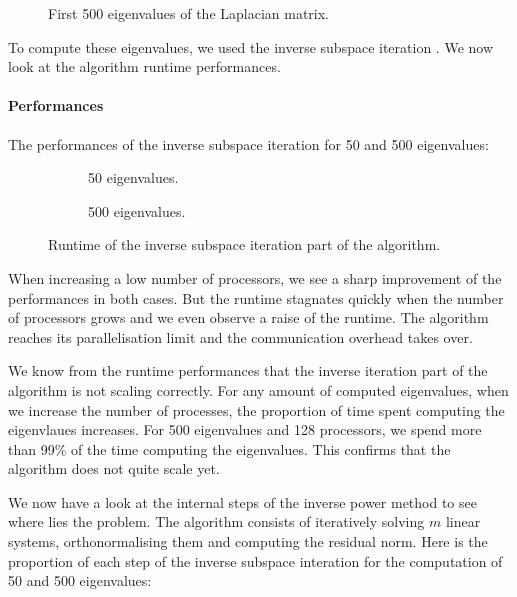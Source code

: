 \begin{figure}[H]
  \centering
  
  \caption{First 500 eigenvalues of the Laplacian matrix.}
\end{figure}

To compute these eigenvalues, we used the inverse subspace iteration \cite{el_khoury_acceleration_2014}.
We now look at the algorithm runtime performances.

\paragraph{Performances}
The performances of the inverse subspace iteration for 50 and 500 eigenvalues:

\begin{figure}[H]
  \centering
  \begin{subfigure}[b]{0.5\textwidth}
   
   \caption{50 eigenvalues.}
  \end{subfigure}
  \begin{subfigure}[b]{0.45\textwidth}
   
   \caption{500 eigenvalues.}
  \end{subfigure}
  \caption{Runtime of the inverse subspace iteration part of the algorithm.}
\end{figure}

When increasing a low number of processors, we see a sharp improvement of the performances in both cases.
But the runtime stagnates quickly when the number of processors grows and we even observe a raise of the runtime.
The algorithm reaches its parallelisation limit and the communication overhead takes over.

We know from the runtime performances that the inverse iteration part of the algorithm is not scaling correctly.
For any amount of computed eigenvalues, when we increase the number of processes, the proportion of time spent computing the eigenvlaues increases.
For 500 eigenvalues and 128 processors, we spend more than 99\% of the time computing the eigenvalues.
This confirms that the algorithm does not quite scale yet.

We now have a look at the internal steps of the inverse power method to see where lies the problem.
The algorithm consists of iteratively solving \(m\) linear systems, orthonormalising them and computing the residual norm.
Here is the proportion of each step of the inverse subspace interation for the computation of 50 and 500 eigenvalues:

